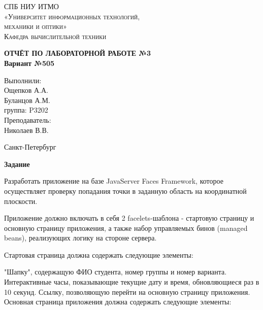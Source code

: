 \documentclass[14pt,a4paper,report]{ncc}
\begin{document}
\def\contentsname{Содержание}




\begin{titlepage}
\begin{center}
\textsc{СПБ НИУ ИТМО \\[2mm]«Университет информационных технологий,\\ механики и оптики»\\[5mm]
Кафедра вычислительной техники\\[2mm]}


\vfill

\textbf{ОТЧЁТ ПО ЛАБОРАТОРНОЙ РАБОТЕ №3\\[3mm]
Вариант №505 \\[25mm]
}
\end{center}

\hfill
\begin{minipage}{.3\textwidth}
Выполнили:  \\[2mm] 
Ощепков А.А.\\
Буланцов А.М. \\
группа: P3202\\[5mm]

Преподаватель:\\[2mm] 
Николаев В.В.
\end{minipage}%
\vfill
\begin{center}
Санкт-Петербург \theyear\
\end{center}
\end{titlepage}

\newpage
\large \textbf{Задание} 
\small
\par

Разработать приложение на базе JavaServer Faces Framework, которое осуществляет проверку попадания точки в заданную область на координатной плоскости.

Приложение должно включать в себя 2 facelets-шаблона - стартовую страницу и основную страницу приложения, а также набор управляемых бинов (managed beans), реализующих логику на стороне сервера.

Стартовая страница должна содержать следующие элементы:

"Шапку", содержащую ФИО студента, номер группы и номер варианта.
Интерактивные часы, показывающие текущие дату и время, обновляющиеся раз в 10 секунд.
Ссылку, позволяющую перейти на основную страницу приложения.
Основная страница приложения должна содержать следующие элементы:
\end{document}
